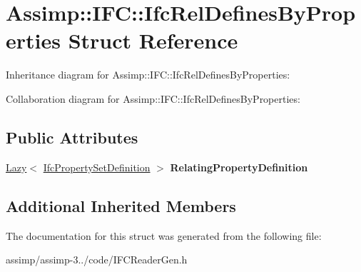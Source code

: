 \hypertarget{struct_assimp_1_1_i_f_c_1_1_ifc_rel_defines_by_properties}{\section{Assimp\+:\+:I\+F\+C\+:\+:Ifc\+Rel\+Defines\+By\+Properties Struct Reference}
\label{struct_assimp_1_1_i_f_c_1_1_ifc_rel_defines_by_properties}
}


Inheritance diagram for Assimp\+:\+:I\+F\+C\+:\+:Ifc\+Rel\+Defines\+By\+Properties\+:


Collaboration diagram for Assimp\+:\+:I\+F\+C\+:\+:Ifc\+Rel\+Defines\+By\+Properties\+:
\subsection*{Public Attributes}
\begin{DoxyCompactItemize}
\item 
\hypertarget{struct_assimp_1_1_i_f_c_1_1_ifc_rel_defines_by_properties_a0d2d281d9f845124ac3c2a693fb661db}{\hyperlink{struct_assimp_1_1_s_t_e_p_1_1_lazy}{Lazy}$<$ \hyperlink{struct_assimp_1_1_i_f_c_1_1_ifc_property_set_definition}{Ifc\+Property\+Set\+Definition} $>$ {\bfseries Relating\+Property\+Definition}}\label{struct_assimp_1_1_i_f_c_1_1_ifc_rel_defines_by_properties_a0d2d281d9f845124ac3c2a693fb661db}

\end{DoxyCompactItemize}
\subsection*{Additional Inherited Members}


The documentation for this struct was generated from the following file\+:\begin{DoxyCompactItemize}
\item 
assimp/assimp-\/3../code/I\+F\+C\+Reader\+Gen.\+h\end{DoxyCompactItemize}
